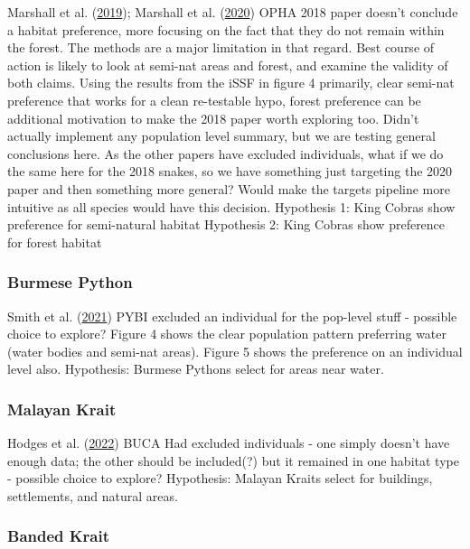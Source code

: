 \documentclass[10pt,a4paper]{article}
\begin{document}
Marshall et al. (\protect\hyperlink{ref-Marshall2018}{2019}); Marshall et al. (\protect\hyperlink{ref-marshall_no_2020}{2020})
OPHA
2018 paper doesn't conclude a habitat preference, more focusing on the fact that they do not remain within the forest.
The methods are a major limitation in that regard.
Best course of action is likely to look at semi-nat areas and forest, and examine the validity of both claims.
Using the results from the iSSF in figure 4 primarily, clear semi-nat preference that works for a clean re-testable hypo, forest preference can be additional motivation to make the 2018 paper worth exploring too.
Didn't actually implement any population level summary, but we are testing general conclusions here.
As the other papers have excluded individuals, what if we do the same here for the 2018 snakes, so we have something just targeting the 2020 paper and then something more general? Would make the targets pipeline more intuitive as all species would have this decision.
Hypothesis 1: King Cobras show preference for semi-natural habitat
Hypothesis 2: King Cobras show preference for forest habitat

\hypertarget{burmese-python-1}{%
\subsubsection{Burmese Python}\label{burmese-python-1}}

Smith et al. (\protect\hyperlink{ref-smith_native_2021}{2021})
PYBI
excluded an individual for the pop-level stuff - possible choice to explore?
Figure 4 shows the clear population pattern preferring water (water bodies and semi-nat areas). Figure 5 shows the preference on an individual level also.
Hypothesis: Burmese Pythons select for areas near water.

\hypertarget{malayan-krait-1}{%
\subsubsection{Malayan Krait}\label{malayan-krait-1}}

Hodges et al. (\protect\hyperlink{ref-hodges_malayan_2022}{2022})
BUCA
Had excluded individuals - one simply doesn't have enough data; the other should be included(?) but it remained in one habitat type - possible choice to explore?
Hypothesis: Malayan Kraits select for buildings, settlements, and natural areas.

\hypertarget{banded-krait-1}{%
\subsubsection{Banded Krait}\label{banded-krait-1}}
\end{document}
